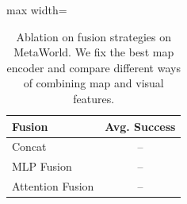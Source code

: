 \begin{table}[t]
\centering
\caption{Ablation on fusion strategies on MetaWorld. We fix the best map encoder and compare different ways of combining map and visual features.}
\label{tab:ablation_fusion}
\small
\setlength{\tabcolsep}{10pt}
\begin{adjustbox}{max width=\columnwidth}
\begin{tabular}{l|c}
\toprule
Fusion & Avg. Success \\
\midrule
Concat & -- \\
MLP Fusion & -- \\
Attention Fusion & -- \\
\bottomrule
\end{tabular}
\end{adjustbox}
\end{table}
